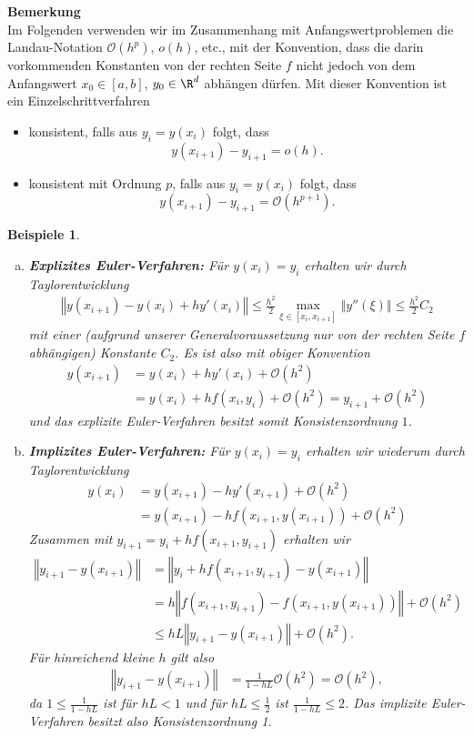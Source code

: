 \documentclass[
]{mycourse}
\theoremstyle{mythm}
\newtheorem{beispiele}[theorem]{Beispiele}
\theoremstyle{break}
\newcommand{\norm}[1]{\left\Vert#1\right\Vert}		%
\begin{document}
\medskip
\textbf{Bemerkung}\\
Im Folgenden verwenden wir im Zusammenhang mit Anfangswertproblemen
die Landau-Notation $\mathcal{O}(h^p)$, $o(h)$, etc., mit der Konvention, dass
die darin vorkommenden Konstanten von der rechten Seite $f$ nicht jedoch von dem Anfangswert $x_0\in [a,b]$, $y_0\in \R^d$
abhängen dürfen. Mit dieser Konvention ist ein Einzelschrittverfahren
\begin{itemize}
\item konsistent, falls aus $y_i=y(x_i)$ folgt, dass 
\[
y(x_{i+1})-y_{i+1}=o(h).
\]
\item konsistent mit Ordnung $p$, falls aus $y_i=y(x_i)$ folgt, dass 
\[
y(x_{i+1})-y_{i+1}=\mathcal{O}(h^{p+1}).
\]
\end{itemize}

\medskip

\begin{beispiele}
\begin{enumerate}[(a)]
\item \textbf{Explizites Euler-Verfahren:} Für $y(x_i)=y_i$ erhalten wir durch Taylorentwicklung
\begin{align*}
\norm{y(x_{i+1}) - y(x_i)+h y'(x_i)}
\leq \frac{h^2}{2} \max_{\xi\in [x_i,x_{i+1}]} \norm{y''(\xi)}\leq \frac{h^2}{2} C_2
\end{align*}
mit einer (aufgrund unserer Generalvoraussetzung nur von der rechten Seite $f$ abhängigen) Konstante $C_2$. Es ist also mit obiger Konvention
\begin{align*}
y(x_{i+1}) &= y(x_i)+h y'(x_i) + \mathcal{O}(h^2)\\
&= y(x_i)+h f(x_i,y_i) + \mathcal{O}(h^2) = y_{i+1} + \mathcal{O}(h^2)
\end{align*}
und das explizite Euler-Verfahren besitzt somit Konsistenzordnung $1$.
%
\item \textbf{Implizites Euler-Verfahren:} Für $y(x_i)=y_i$ erhalten wir wiederum durch Taylorentwicklung
\begin{align*}
y(x_i) &=y(x_{i+1})- h y'(x_{i+1}) + \mathcal{O}(h^2)\\
       &=y(x_{i+1})- h f(x_{i+1},y(x_{i+1})) + \mathcal{O}(h^2)
\end{align*}
Zusammen mit $y_{i+1}=y_i+hf(x_{i+1},y_{i+1})$ erhalten wir
\begin{align*}
\norm{y_{i+1}-y(x_{i+1})} &= \norm{ y_i+h f(x_{i+1},y_{i+1}) - y(x_{i+1})}\\
&= h \norm{ f(x_{i+1},y_{i+1})-f(x_{i+1},y(x_{i+1})) } + \mathcal{O}(h^2)\\
& \leq h L \norm{ y_{i+1}-y(x_{i+1})}+ \mathcal{O}(h^2).
\end{align*}
Für hinreichend kleine $h$ gilt also
\begin{align*}
\norm{y_{i+1}-y(x_{i+1})} &= \frac{1}{1-hL} \mathcal{O}(h^2)=\mathcal{O}(h^2),
\end{align*}
da $ 1 \leq \frac{1}{1-hL} $ ist für $hL < 1$ und für $hL \leq \frac{1}{2}$ ist $ \frac{1}{1-hL} \leq 2$.
Das implizite Euler-Verfahren besitzt also Konsistenzordnung 1.
\end{enumerate}
\end{beispiele}
\end{document}
